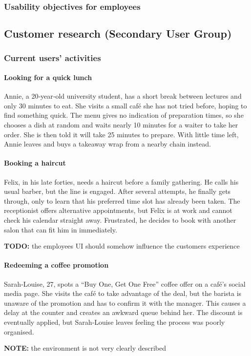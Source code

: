 \documentclass[]{VUMIFTemplateClass}
\newcommand{\noticecomment}[1]{%
    \begin{tcolorbox}[colback=blue!20, colframe=blue!60, arc=0pt, outer arc=0pt, boxrule=1pt, left=3pt, right=3pt, top=3pt, bottom=3pt]
        \textbf{\textcolor{blue!70!black}{NOTE:}} #1
    \end{tcolorbox}
}
\newcommand{\todocomment}[1]{%
    \begin{tcolorbox}[colback=red!20, colframe=red!60, arc=0pt, outer arc=0pt, boxrule=1pt, left=3pt, right=3pt, top=3pt, bottom=3pt]
        \textbf{\textcolor{orange!70!black}{TODO:}} #1
    \end{tcolorbox}
}
\newcommand{\subsubsubsection}[1]{\paragraph{#1}}
\begin{document}
\subsubsection{Usability objectives for employees}


\subsection{Customer research (Secondary User Group)}
\subsubsection{Current users' activities}

\subsubsubsection{Looking for a quick lunch}


Annie, a 20‑year‑old university student, has a short break between lectures and
only 30 minutes to eat. She visits a small café she has not tried before, hoping
to find something quick. The menu gives no indication of preparation times, so
she chooses a dish at random and waits nearly 10 minutes for a waiter to take
her order. She is then told it will take 25 minutes to prepare. With little time
left, Annie leaves and buys a takeaway wrap from a nearby chain instead.

\newpage

\subsubsubsection{Booking a haircut}


Felix, in his late forties, needs a haircut before a family gathering. He calls
his usual barber, but the line is engaged. After several attempts, he finally
gets through, only to learn that his preferred time slot has already been taken.
The receptionist offers alternative appointments, but Felix is at work and
cannot check his calendar straight away. Frustrated, he decides to book with
another salon that can fit him in immediately.
\todocomment{the employees UI should somehow influence the customers experience}

\subsubsubsection{Redeeming a coffee promotion}


Sarah‑Louise, 27, spots a “Buy One, Get One Free” coffee offer on a café’s
social media page. She visits the café to take advantage of the deal, but the
barista is unaware of the promotion and has to confirm it with the manager. This
causes a delay at the counter and creates an awkward queue behind  her. The
discount is eventually applied, but Sarah‑Louise leaves feeling the process was
poorly organised.
\noticecomment{the environment is not very clearly described}
\end{document}
